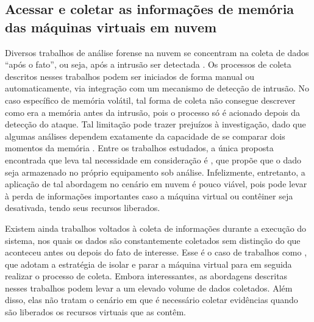 \subsection{Acessar e coletar as informações de memória das máquinas virtuais em nuvem}
\label{sec:coletadeevidencia}

Diversos trabalhos de análise forense na nuvem se concentram na coleta de dados ``após o fato'', ou seja, após a intrusão ser detectada \cite{ReichertAutoAcquisition:2015,PoiselVMI:2013,DykstraFROST:2013,GeorgeDF2CE:2012,SangLogApproach:2013}. 
%
Os processos de coleta descritos nesses trabalhos podem ser iniciados de forma manual ou automaticamente, via integração com um mecanismo de detecção de intrusão. 
%
No caso específico de memória volátil, tal forma de coleta não consegue descrever como era a memória antes da intrusão, pois o processo só é acionado depois da detecção do ataque. 
%
Tal limitação pode trazer prejuízos à investigação, dado que algumas análises dependem exatamente da capacidade de se comparar dois momentos da memória \cite{CaseMemoryForensics:2014}. 
%
Entre os trabalhos estudados, a única proposta encontrada que leva tal necessidade em consideração é \cite{DezfouliBackupApproach:2012}, que propõe que o dado seja armazenado no próprio equipamento sob análise.
%
Infelizmente, entretanto, a aplicação de tal abordagem no cenário em nuvem é pouco viável, pois pode levar à perda de informações importantes caso a máquina virtual ou contêiner seja desativada, tendo seus recursos liberados.
%

Existem ainda trabalhos voltados à coleta de informações durante a execução do sistema, nos quais os dados são constantemente coletados sem distinção do que aconteceu antes ou depois do fato de interesse.
%
Esse é o caso de trabalhos como \cite{PoiselVMI:2013,DykstraFROST:2013,SangLogApproach:2013,Dolan-GavittSemanticGap:2011}, que adotam a estratégia de isolar e parar a máquina virtual para em seguida realizar o processo de coleta. 
%
Embora interessantes, as abordagens descritas nesses trabalhos podem levar a um elevado volume de dados coletados.
%
Além disso, elas não tratam o cenário em que é necessário coletar evidências quando são liberados os recursos virtuais que as contêm.


